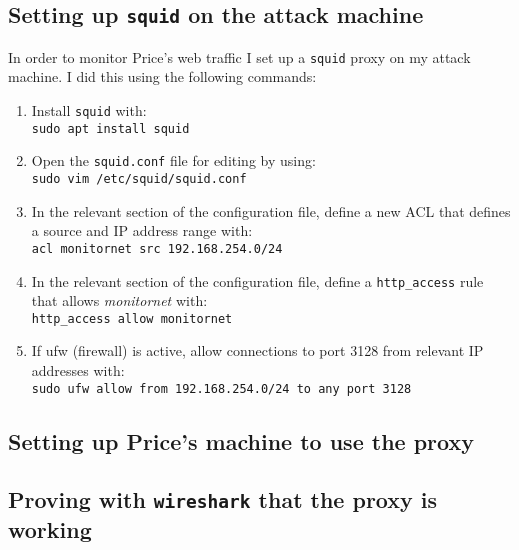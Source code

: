 \documentclass[12pt]{report}
\newcommand{\term}[1]{\colorbox{light-gray}{\texttt{#1}}}
\begin{document}
\subsection{Setting up \texttt{squid} on the attack machine}
In order to monitor Price's web traffic I set up a \texttt{squid} proxy on my attack machine. I did this using the following commands:
\begin{enumerate}
  \item Install \texttt{squid} with:\\
        \term{sudo apt install squid}
  \item Open the \texttt{squid.conf} file for editing by using:\\
        \term{sudo vim /etc/squid/squid.conf}
  \item In the relevant section of the configuration file, define a new ACL that defines a source and IP address range with:\\
        \term{acl monitornet src 192.168.254.0/24}
  \item In the relevant section of the configuration file, define a \texttt{http\_access} rule that allows \textit{monitornet} with:\\
        \term{http\_access allow monitornet}
  \item If ufw (firewall) is active, allow connections to port 3128 from relevant IP addresses with:\\
        \term{sudo ufw allow from 192.168.254.0/24 to any port 3128}
\end{enumerate}

\subsection{Setting up Price's machine to use the proxy}
%


\subsection{Proving with \texttt{wireshark} that the proxy is working}
\end{document}
